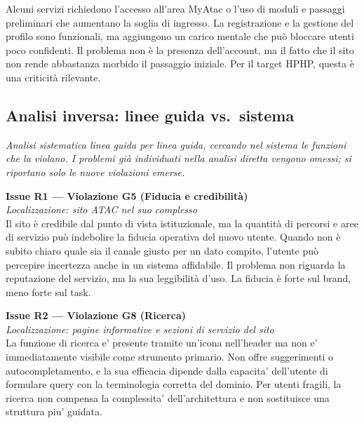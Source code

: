 \documentclass[11pt,a4paper]{article}
\begin{document}
\noindent Alcuni servizi richiedono l’accesso all’area MyAtac o l’uso di moduli e passaggi preliminari che aumentano la soglia di ingresso. La registrazione e la gestione del profilo sono funzionali, ma aggiungono un carico mentale che può bloccare utenti poco confidenti. Il problema non è la presenza dell’account, ma il fatto che il sito non rende abbastanza morbido il passaggio iniziale. Per il target HPHP, questa è una criticità rilevante.

\subsection*{Analisi inversa: linee guida vs.\ sistema}

\noindent\textit{Analisi sistematica linea guida per linea guida, cercando nel sistema le funzioni che la violano. I problemi già individuati nella analisi diretta vengono omessi; si riportano solo le nuove violazioni emerse.}

\bigskip

\noindent\textbf{Issue R1 — Violazione G5 (Fiducia e credibilità)}\label{atac:R1}\\
\textit{Localizzazione: sito ATAC nel suo complesso}\\

\noindent Il sito è credibile dal punto di vista istituzionale, ma la quantità di percorsi e aree di servizio può indebolire la fiducia operativa del nuovo utente. Quando non è subito chiaro quale sia il canale giusto per un dato compito, l’utente può percepire incertezza anche in un sistema affidabile. Il problema non riguarda la reputazione del servizio, ma la sua leggibilità d’uso. La fiducia è forte sul brand, meno forte sul task.

\bigskip

\noindent\textbf{Issue R2 — Violazione G8 (Ricerca)}\label{atac:R2}\\
\textit{Localizzazione: pagine informative e sezioni di servizio del sito}\\

\noindent La funzione di ricerca e' presente tramite un'icona nell'header ma non e' immediatamente visibile come strumento primario. Non offre suggerimenti o autocompletamento, e la sua efficacia dipende dalla capacita' dell'utente di formulare query con la terminologia corretta del dominio. Per utenti fragili, la ricerca non compensa la complessita' dell'architettura e non sostituisce una struttura piu' guidata.
\end{document}
